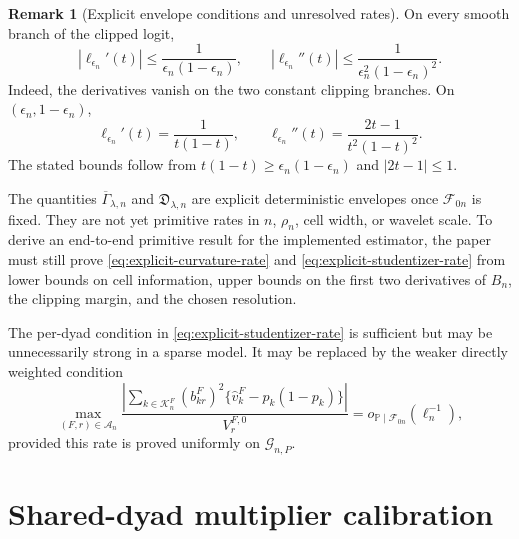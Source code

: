 \documentclass[11pt]{article}
\theoremstyle{definition}
\newtheorem{remark}[definition]{Remark}
\newcommand{\1}{\mathbf 1}\newcommand{\op}{\operatorname}
\begin{document}
\begin{remark}[Explicit envelope conditions and unresolved rates]
\label{rem:explicit-envelope-conditions}
On every smooth branch of the clipped logit,
\[
|\ell_{\epsilon_n}'(t)|
\le
\frac{1}{\epsilon_n(1-\epsilon_n)},
\qquad
|\ell_{\epsilon_n}''(t)|
\le
\frac{1}{
\epsilon_n^2(1-\epsilon_n)^2
}.
\]
Indeed, the derivatives vanish on the two constant clipping branches.
On $(\epsilon_n,1-\epsilon_n)$,
\[
\ell_{\epsilon_n}'(t)
=
\frac{1}{t(1-t)},
\qquad
\ell_{\epsilon_n}''(t)
=
\frac{2t-1}{t^2(1-t)^2}.
\]
The stated bounds follow from
$t(1-t)\ge\epsilon_n(1-\epsilon_n)$ and $|2t-1|\le1$.

The quantities
$\overline\Gamma_{\lambda,n}$ and
$\mathfrak D_{\lambda,n}$ are explicit deterministic envelopes once
$\mathcal F_{0n}$ is fixed. They are not yet primitive rates in
$n$, $\rho_n$, cell width, or wavelet scale. To derive an end-to-end
primitive result for the implemented estimator, the paper must still prove
\eqref{eq:explicit-curvature-rate} and
\eqref{eq:explicit-studentizer-rate} from lower bounds on cell
information, upper bounds on the first two derivatives of $B_n$,
the clipping margin, and the chosen resolution.

The per-dyad condition in \eqref{eq:explicit-studentizer-rate} is
sufficient but may be unnecessarily strong in a sparse model. It may
be replaced by the weaker directly weighted condition
\[
\max_{(F,r)\in\mathcal A_n}
\frac{
\left|
\sum_{k\in\mathcal K_n^F}
(b_{kr}^F)^2
\{\widehat v_k^F-p_k(1-p_k)\}
\right|
}{
V_r^{F,0}
}
=
o_{\mathbb P\mid\mathcal F_{0n}}(\ell_n^{-1}),
\]
provided this rate is proved uniformly on $\mathcal G_{n,P}$.
\end{remark}



\section{Shared-dyad multiplier calibration}\label{sec:supp-mult}

\end{document}
